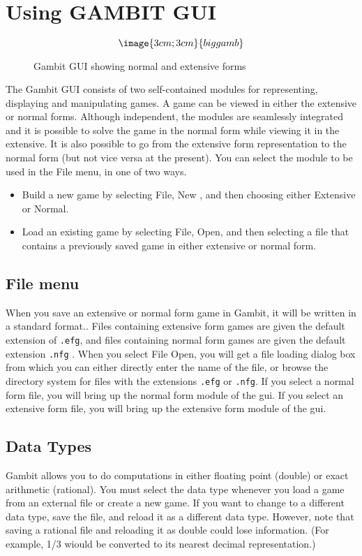 \chapter{Using GAMBIT GUI}

\begin{figure}
$$\image{3cm;3cm}{biggamb}$$
\caption{Gambit GUI showing normal and extensive
forms}\label{fig:biggamb}
\end{figure}

The Gambit GUI consists of two self-contained modules for representing,
displaying and manipulating games.  A game can be viewed in either the
extensive or normal forms.  Although independent, the modules are
seamlessly integrated and it is possible to solve the game in the normal
form while viewing it in the extensive.  It is also possible to go from
the extensive form representation to the normal form (but not vice versa
at the present).   You can select the module to be used in the File menu,
in one of two ways.

\begin{itemize}
\item
Build a new game by selecting File, New , and then choosing either
Extensive or Normal.
\item
Load an existing game by selecting File, Open, and then selecting a file
that contains a previously saved game in either extensive or normal form.
\end{itemize}

\section{File menu}
When you save an extensive or normal form game in Gambit, it will be
written in a standard format..  Files containing extensive form games are
given the default extension of \verb+.efg+, and files containing normal
form games are given the default extension \verb+.nfg+ .  When you select
File Open, you will get a file loading dialog box from which you can
either directly enter the name of the file, or browse the directory system
for files with the extensions \verb+.efg+ or \verb+.nfg+.  If you select a
normal form file, you will bring up the normal form module of the gui.  If
you select an extensive form file, you will bring up the extensive form
module of the gui.

\section{Data Types}
Gambit allows you to do computations in either floating point (double) or
exact arithmetic (rational).  You must select the data type whenever you
load a game from an external file or create a new game.  If you want to
change to a different data type, save the file, and reload it as a
different data type.  However, note that saving a rational file and
reloading it as double could lose information.  (For example, 1/3 wiould
be converted to its nearest decimal representation.)

